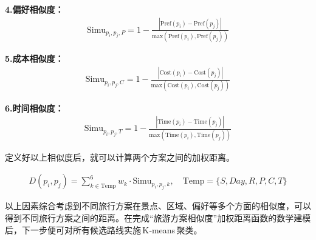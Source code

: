 \noindent\textbf{4.偏好相似度：}
\begin{equation}
  \begin{aligned}
    \text{Simu}_{p_{i},p_{j},P} = 1-\frac{|\text{Pref}(p_{i})-\text{Pref}(p_{j})|}{\text{max}(\text{Pref}(p_{i}),\text{Pref}(p_{j}))}
  \end{aligned}
\end{equation}

\noindent\textbf{5.成本相似度：}
\begin{equation}
  \begin{aligned}
    \text{Simu}_{p_{i},p_{j},C} = 1-\frac{|\text{Cost}(p_{i})-\text{Cost}(p_{j})|}{\text{max}(\text{Cost}(p_{i}),\text{Cost}(p_{j}))}
  \end{aligned}
\end{equation}

\noindent\textbf{6.时间相似度：}
\begin{equation}
  \begin{aligned}
    \text{Simu}_{p_{i},p_{j},T} = 1-\frac{|\text{Time}(p_{i})-\text{Time}(p_{j})|}{\text{max}(\text{Time}(p_{i}),\text{Time}(p_{j}))}
  \end{aligned}
\end{equation}

定义好以上相似度后，就可以计算两个方案之间的加权距离。

\begin{equation}
  \begin{aligned}
    D(p_{i},p_{j}) = \sum_{k\in \text{Temp}}^{6}w_{k}\cdot\text{Simu}_{p_{i},p_{j},k},\quad \text{Temp}=\{S,Day,R,P,C,T\}
  \end{aligned}
\end{equation}

以上因素综合考虑到不同旅行方案在景点、区域、偏好等多个方面的相似度，可以得到不同旅行方案之间的距离。在完成“旅游方案相似度”加权距离函数的数学建模后，下一步便可对所有候选路线实施 K‑means 聚类。




